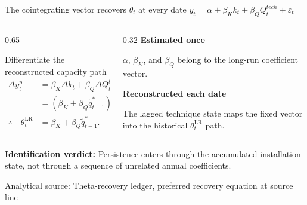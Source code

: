 \documentclass[10pt,aspectratio=169]{beamer}
\newcommand{\LR}{\mathrm{LR}}
\newcommand{\sourcefooter}[1]{%
  \par\vfill{\tiny\color{gray!70}Analytical source: #1}\vspace{-0.35em}}
\begin{document}
\begin{frame}{The cointegrating vector recovers $\theta_t$ at every date}
  \centering
  \large $y_t=\alpha+\beta_K k_t+\beta_Q Q_t^{tech}+\varepsilon_t$
  \vspace{0.35em}
  \begin{columns}[T,onlytextwidth]
    \begin{column}{0.65\textwidth}
      \begin{block}{Differentiate the reconstructed capacity path}
        \centering
        \begin{align*}
          \Delta y_t^p
          &=\beta_K\Delta k_t+\beta_Q\Delta Q_t^{tech} \\
          &=\left(\beta_K+\beta_Q\widetilde q_{t-1}^*\right)\Delta k_t, \\
          \therefore\quad
          \theta_t^{\LR}
          &=\beta_K+\beta_Q\widetilde q_{t-1}^*.
        \end{align*}
      \end{block}
    \end{column}
    \begin{column}{0.32\textwidth}
      \small\textbf{Estimated once}\par
        $\alpha$, $\beta_K$, and $\beta_Q$ belong to the long-run coefficient vector.

      \vspace{0.8em}
      \textbf{Reconstructed each date}\par
        The lagged technique state maps the fixed vector into the historical $\theta_t^{\LR}$ path.
    \end{column}
  \end{columns}
  \vspace{0.35em}
  \raggedright\textbf{Identification verdict:} Persistence enters through the accumulated installation state, not through a sequence of unrelated annual coefficients.
  \sourcefooter{Theta-recovery ledger, preferred recovery equation at source line \LinePreferredRecovery}
\end{frame}
\end{document}
